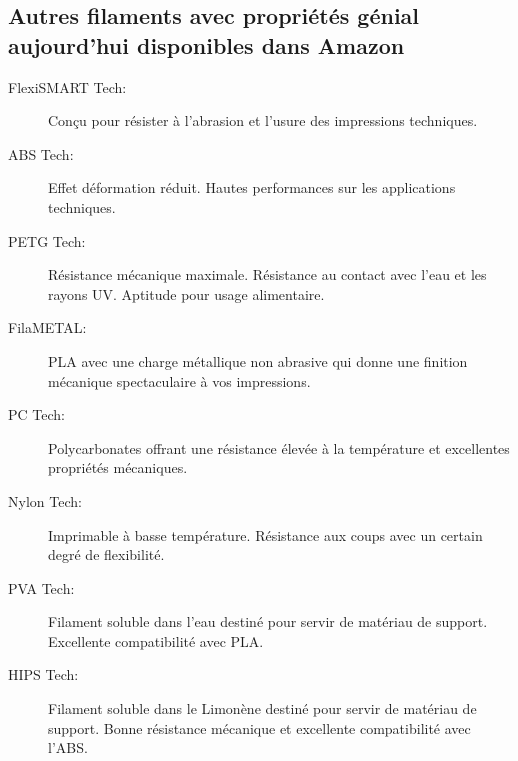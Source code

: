 \documentclass[11pt,a4paper]{article}
\begin{document}
\subsection{Autres filaments avec propriétés génial aujourd'hui disponibles dans Amazon}
\begin{description}
  \item[FlexiSMART Tech:] Conçu pour résister à l’abrasion et l’usure des impressions techniques.
\item[ABS Tech:] Effet déformation réduit. Hautes performances sur les applications techniques.
\item[PETG Tech:] Résistance mécanique maximale. Résistance au contact avec l’eau et les rayons UV. Aptitude pour usage alimentaire.
\item[FilaMETAL:] PLA avec une charge métallique non abrasive qui donne une finition mécanique spectaculaire à vos impressions.
\item[PC Tech:] Polycarbonates offrant une résistance élevée à la température et excellentes propriétés mécaniques.
\item[Nylon Tech:] Imprimable à basse température. Résistance aux coups avec un certain degré de flexibilité.
\item[PVA Tech:] Filament soluble dans l’eau destiné pour servir de matériau de support. Excellente compatibilité avec PLA.
\item[HIPS Tech:] Filament soluble dans le Limonène destiné pour servir de matériau de support. Bonne résistance mécanique et excellente compatibilité avec l'ABS.
\end{description}

\end{document}
